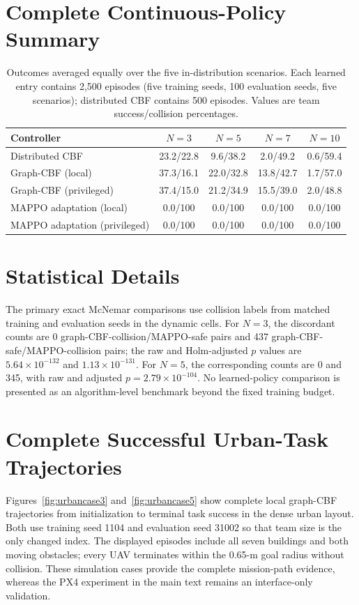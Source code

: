 \documentclass{article}
\begin{document}
\section{Complete Continuous-Policy Summary}

\begin{table}[H]
\caption{Outcomes averaged equally over the five in-distribution scenarios. Each learned entry contains 2,500 episodes (five training seeds, 100 evaluation seeds, five scenarios); distributed CBF contains 500 episodes. Values are team success/collision percentages.}
\label{tab:allpolicies}
\centering
\small
\begin{tabular}{lcccc}
\toprule
Controller & $N=3$ & $N=5$ & $N=7$ & $N=10$ \\
\midrule
Distributed CBF & 23.2/22.8 & 9.6/38.2 & 2.0/49.2 & 0.6/59.4 \\
Graph-CBF (local) & 37.3/16.1 & 22.0/32.8 & 13.8/42.7 & 1.7/57.0 \\
Graph-CBF (privileged) & 37.4/15.0 & 21.2/34.9 & 15.5/39.0 & 2.0/48.8 \\
MAPPO adaptation (local) & 0.0/100 & 0.0/100 & 0.0/100 & 0.0/100 \\
MAPPO adaptation (privileged) & 0.0/100 & 0.0/100 & 0.0/100 & 0.0/100 \\
\bottomrule
\end{tabular}
\end{table}

\section{Statistical Details}

The primary exact McNemar comparisons use collision labels from matched training and evaluation seeds in the dynamic cells. For $N=3$, the discordant counts are 0 graph-CBF-collision/MAPPO-safe pairs and 437 graph-CBF-safe/MAPPO-collision pairs; the raw and Holm-adjusted $p$ values are $5.64\times10^{-132}$ and $1.13\times10^{-131}$. For $N=5$, the corresponding counts are 0 and 345, with raw and adjusted $p=2.79\times10^{-104}$. No learned-policy comparison is presented as an algorithm-level benchmark beyond the fixed training budget.

\section{Complete Successful Urban-Task Trajectories}

Figures~\ref{fig:urbancase3} and~\ref{fig:urbancase5} show complete local graph-CBF trajectories from initialization to terminal task success in the dense urban layout. Both use training seed 1104 and evaluation seed 31002 so that team size is the only changed index. The displayed episodes include all seven buildings and both moving obstacles; every UAV terminates within the 0.65-m goal radius without collision. These simulation cases provide the complete mission-path evidence, whereas the PX4 experiment in the main text remains an interface-only validation.
\end{document}
